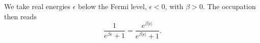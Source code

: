 \documentclass{article}
\begin{document}
We take real energies $\epsilon$ below the Fermi level, $\epsilon<0$, with $\beta>0$. The occupation
then reads
\begin{equation}
\frac{1}{e^{\beta\epsilon}+1} = \frac{e^{\beta|\epsilon|}}{e^{\beta|\epsilon|}+1} .
\label{eq:occ}
\end{equation}
\end{document}

